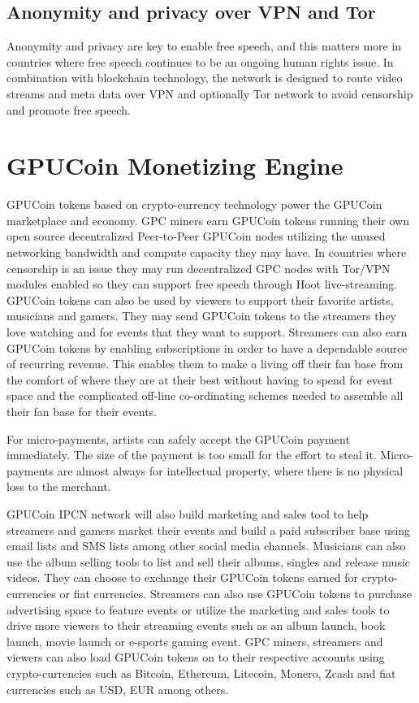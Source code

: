 \documentclass{article}
\begin{document}
\subsection{Anonymity and privacy over VPN and Tor}
Anonymity and privacy are key to enable free speech, and this matters more in countries where free speech continues to be an ongoing human rights issue. In combination with blockchain technology, the network is
designed to route video streams and meta data over VPN and optionally Tor network to avoid censorship and promote free speech.

\section{GPUCoin Monetizing Engine}
GPUCoin tokens based on crypto-currency technology power the GPUCoin marketplace and economy. GPC miners earn GPUCoin tokens running their own open source decentralized Peer-to-Peer GPUCoin nodes utilizing the unused networking bandwidth and compute capacity they may have. 
In countries where censorship is an issue they may run decentralized GPC nodes with Tor/VPN modules enabled so they can support free speech through Hoot live-streaming.
 GPUCoin tokens can also be used by viewers to support their favorite artists, musicians and gamers. They may send GPUCoin tokens to the streamers they love watching and for events that they want to support. Streamers can also earn GPUCoin tokens by enabling subscriptions in order to have a dependable source of recurring revenue. This enables them to make a living off their fan base from the comfort of where they are at their best without having to spend for event space and the complicated off-line co-ordinating schemes needed to assemble all their fan base for their events.

For micro-payments, artists can safely accept the GPUCoin payment immediately. The size of the payment is too small for the effort to steal it. Micro-payments are almost always for intellectual property, where there is no physical loss to the merchant.

 GPUCoin IPCN network will also build marketing and sales tool to help streamers and gamers market their events and build a paid subscriber base using email lists and SMS lists among other social media channels. 
Musicians can also use the album selling tools to list and sell their albums, singles and release music videos. They can choose to exchange their GPUCoin tokens earned for crypto-currencies or fiat currencies.
 Streamers can also use GPUCoin tokens to purchase advertising space to feature events or utilize the marketing and sales tools to drive more viewers to their streaming events such as an album launch, book launch, movie launch or e-sports gaming event. GPC miners, streamers and viewers can also load GPUCoin tokens on to their respective accounts using crypto-currencies such as Bitcoin, Ethereum, Litecoin, Monero, Zcash and fiat currencies such as USD, EUR among others.
\end{document}
